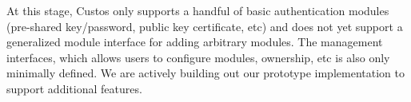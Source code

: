At this stage, Custos only supports a handful of basic authentication
modules (pre-shared key/password, public key certificate, etc) and
does not yet support a generalized module interface for adding
arbitrary modules. The management interfaces, which allows users to
configure modules, ownership, etc is also only minimally defined. We
are actively building out our prototype implementation to support
additional features.
